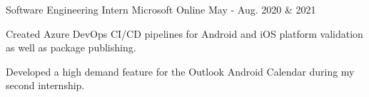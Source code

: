 \begin{cventries}
{\begin{cvitems}
      \end{cvitems}
    }
  \cventry
    {Software Engineering Intern}
    {Microsoft}
    {Online}
    {May - Aug. 2020 \& 2021}
    {
      \begin{cvitems}
        \item{Created Azure DevOps CI/CD pipelines for Android and iOS platform validation as well as package publishing.}
        \item{Developed a high demand feature for the Outlook Android Calendar during my second internship.}
      \end{cvitems}
    }
\end{cventries}
